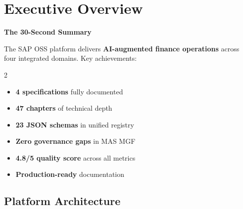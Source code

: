 \documentclass[11pt,a4paper]{report}
\begin{document}
\chapter*{Executive Overview}

\begin{mdframed}[style=highlightbox]
\begin{center}
{\Large\bfseries\textcolor{sapamberdark}{The 30-Second Summary}}
\end{center}
\vspace{0.3cm}

The SAP OSS platform delivers \textbf{AI-augmented finance operations} across
four integrated domains. Key achievements:

\begin{multicols}{2}
\begin{itemize}[nosep,leftmargin=*]
  \item[\textcolor{successgreen}{\ding{51}}] \textbf{4 specifications} fully documented
  \item[\textcolor{successgreen}{\ding{51}}] \textbf{47 chapters} of technical depth
  \item[\textcolor{successgreen}{\ding{51}}] \textbf{23 JSON schemas} in unified registry
  \item[\textcolor{successgreen}{\ding{51}}] \textbf{Zero governance gaps} in MAS MGF
  \item[\textcolor{successgreen}{\ding{51}}] \textbf{4.8/5 quality score} across all metrics
  \item[\textcolor{successgreen}{\ding{51}}] \textbf{Production-ready} documentation
\end{itemize}
\end{multicols}
\end{mdframed}

\vspace{0.5cm}

\section*{Platform Architecture}
\end{document}

